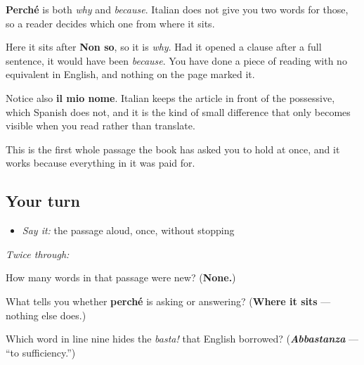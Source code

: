 \begin{culture}
\textbf{Perché} is both \emph{why} and \emph{because}. Italian does not give you two words for those, so a reader decides which one from where it sits.

Here it sits after \textbf{Non so}, so it is \emph{why}. Had it opened a clause after a full sentence, it would have been \emph{because}. You have done a piece of reading with no equivalent in English, and nothing on the page marked it.

Notice also \textbf{il mio nome}. Italian keeps the article in front of the possessive, which Spanish does not, and it is the kind of small difference that only becomes visible when you read rather than translate.

This is the first whole passage the book has asked you to hold at once, and it works because everything in it was paid for.
\end{culture}

\subsection*{Your turn}
\begin{itemize}
\raggedright
  \item \emph{Say it:} the passage aloud, once, without stopping
\end{itemize}

\emph{Twice through:}

\begin{tcolorbox}[breakable,colback=teal!4,colframe=teal!35!black,title={Before you move on}]
How many words in that passage were new? (\textbf{None.})

What tells you whether \textbf{perché} is asking or answering? (\textbf{Where it sits} — nothing else does.)

Which word in line nine hides the \emph{basta!} that English borrowed? (\emph{\textbf{Abbastanza}} — \textquotedblleft{}to sufficiency.\textquotedblright{})
\end{tcolorbox}

